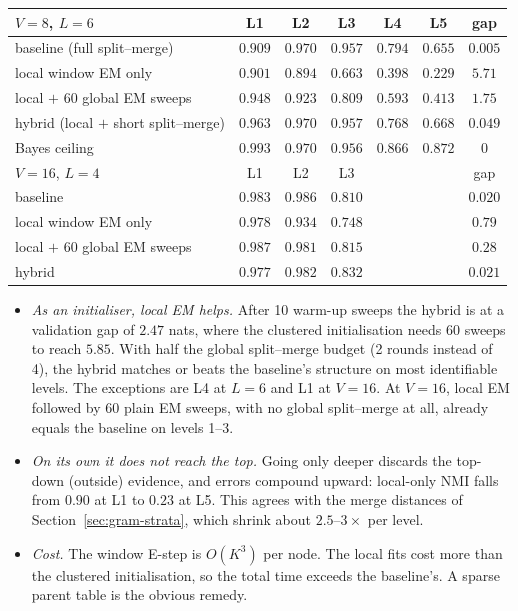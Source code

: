 \documentclass[11pt]{article}
\theoremstyle{definition}
\theoremstyle{remark}
\begin{document}
\begin{center}\small
\begin{tabular}{lcccccc}
\toprule
$V=8$, $L=6$ & L1 & L2 & L3 & L4 & L5 & gap\\
\midrule
baseline (full split--merge) & $0.909$ & $0.970$ & $0.957$ & $0.794$ & $0.655$ & $0.005$\\
local window EM only & $0.901$ & $0.894$ & $0.663$ & $0.398$ & $0.229$ & $5.71$\\
local $+$ 60 global EM sweeps & $0.948$ & $0.923$ & $0.809$ & $0.593$ & $0.413$ & $1.75$\\
hybrid (local $+$ short split--merge) & $\mathbf{0.963}$ & $0.970$ & $0.957$ & $0.768$ & $\mathbf{0.668}$ & $0.049$\\
Bayes ceiling & $0.993$ & $0.970$ & $0.956$ & $0.866$ & $0.872$ & $0$\\
\midrule
$V=16$, $L=4$ & L1 & L2 & L3 & & & gap\\
\midrule
baseline & $0.983$ & $0.986$ & $0.810$ & & & $0.020$\\
local window EM only & $0.978$ & $0.934$ & $0.748$ & & & $0.79$\\
local $+$ 60 global EM sweeps & $\mathbf{0.987}$ & $0.981$ & $0.815$ & & & $0.28$\\
hybrid & $0.977$ & $0.982$ & $\mathbf{0.832}$ & & & $0.021$\\
\bottomrule
\end{tabular}
\end{center}
\begin{itemize}
  \item \emph{As an initialiser, local EM helps.} After 10 warm-up sweeps the hybrid is at a validation gap of $2.47$ nats, where the clustered initialisation needs 60 sweeps to reach $5.85$. With half the global split--merge budget (2 rounds instead of 4), the hybrid matches or beats the baseline's structure on most identifiable levels. The exceptions are L4 at $L=6$ and L1 at $V=16$. At $V=16$, local EM followed by 60 plain EM sweeps, with no global split--merge at all, already equals the baseline on levels 1--3.
  \item \emph{On its own it does not reach the top.} Going only deeper discards the top-down (outside) evidence, and errors compound upward: local-only NMI falls from $0.90$ at L1 to $0.23$ at L5. This agrees with the merge distances of Section~\ref{sec:gram-strata}, which shrink about $2.5$--$3\times$ per level.
  \item \emph{Cost.} The window E-step is $O(K^3)$ per node. The local fits cost more than the clustered initialisation, so the total time exceeds the baseline's. A sparse parent table is the obvious remedy.
\end{itemize}
\end{document}
